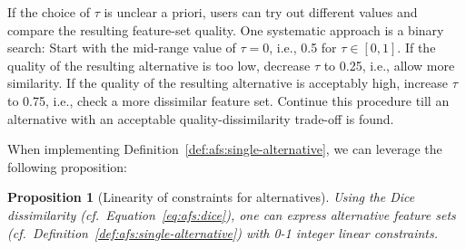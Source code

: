 \documentclass{article}
\newtheorem{proposition}{Proposition}
\theoremstyle{definition}
\begin{document}
If the choice of $\tau$ is unclear a priori, users can try out different values and compare the resulting feature-set quality.
One systematic approach is a binary search:
Start with the mid-range value of $\tau=0$, i.e., 0.5 for $\tau \in [0,1]$.
If the quality of the resulting alternative is too low, decrease $\tau$ to 0.25, i.e., allow more similarity.
If the quality of the resulting alternative is acceptably high, increase $\tau$ to 0.75, i.e., check a more dissimilar feature set.
Continue this procedure till an alternative with an acceptable quality-dissimilarity trade-off is found.

When implementing Definition~\ref{def:afs:single-alternative}, we can leverage the following proposition:
%
\begin{proposition}[Linearity of constraints for alternatives]
	Using the Dice dissimilarity (cf.~Equation~\ref{eq:afs:dice}), one can express alternative feature sets (cf.~Definition~\ref{def:afs:single-alternative}) with 0-1 integer linear constraints.
	\label{prop:afs:linear-constraints}
\end{proposition}
%
\end{document}
